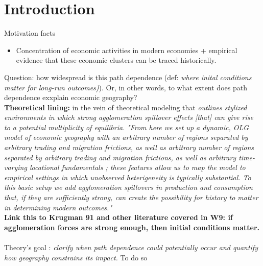 \documentclass[12pt, final]{article}
\begin{document}
\section{Introduction} %
\label{sec:introduction}

Motivation facts
\begin{itemize}
    \item Concentration of economic activities in modern economies + empirical evidence that these economic clusters can be traced historically.
\end{itemize}
Question: how widespread is this path dependence (def: \textit{where inital conditions matter for long-run outcomes)}). Or, in other words, to what extent does path dependence exxplain economic geography?
\\
\textbf{Theoretical lining:} in the vein of theoretical modeling that \textit{outlines stylized environments in which strong agglomeration spillover effects [that] can give rise to a potential multiplicity of equilibria.} \textit{"From here we set up a dynamic, OLG model of economic geography with an arbitrary number of regions separated by arbitrary trading and migration frictions, as well as arbitrary number of regions separated by arbitrary trading and migration frictions, as well as arbitrary time-varying locational fundamentals ; these features allow us to map the model to empirical settings in which unobserved heterigeneity is typically substantial. To this basic setup we add agglomeration spillovers in production and consumption that, if they are sufficiently strong, can create the possibility for history to matter in determining modern outcomes."}
\\
\textbf{Link this to Krugman 91 and other literature covered in W9: if agglomeration forces are strong enough, then initial conditions matter.}
\\
\\
Theory's goal : \textit{clarify when path dependence could potentially occur and quantify how geography constrains its impact.}
To do so 
\end{document}
